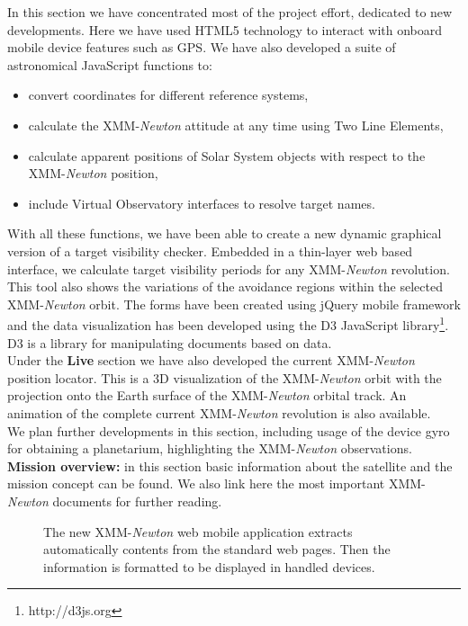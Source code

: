 \documentclass[11pt,twoside]{article}
\newcommand{\xmm}{{XMM-{\em Newton} }}
\begin{document}
In this section we have concentrated most of the project effort,
dedicated to new developments. Here we have used HTML5 technology to
interact with onboard mobile device features such as GPS. We have also
developed a suite of astronomical JavaScript functions to:
\begin{itemize}
\item convert coordinates for different reference systems,
\item calculate the \xmm attitude at any time using Two Line Elements,
\item calculate apparent positions of Solar System objects with respect to the \xmm position,
\item include Virtual Observatory interfaces to resolve target names.
\end{itemize}

With all these functions, we have been able to create a new dynamic
graphical version of a target visibility checker. Embedded in a
thin-layer web based interface, we calculate target visibility periods
for any \xmm revolution. This tool also shows the variations of the
avoidance regions within the selected \xmm orbit. The forms have been
created using jQuery mobile framework and the data visualization has
been developed using the D3 JavaScript
library\footnote{http://d3js.org}. D3 is a library for manipulating
documents based on data. \\

Under the {\bf Live} section we have also developed the current \xmm
position locator. This is a 3D visualization of the \xmm orbit with
the projection onto the Earth surface of the \xmm orbital track. An
animation of the complete current \xmm revolution is also available. \\

We plan further developments in this section, including usage of the
device gyro for obtaining a planetarium, highlighting the \xmm observations.\\

{\bf Mission overview:} in this section basic information about the satellite and
the mission concept can be found. We also link here the
most important \xmm documents for further reading. \\

\begin{figure}[h]
\caption{ The new \xmm web mobile application extracts automatically
contents from the standard web pages. Then the information is formatted
to be displayed in handled devices.} \label{P061-fig-1}
\end{figure}
\end{document}
